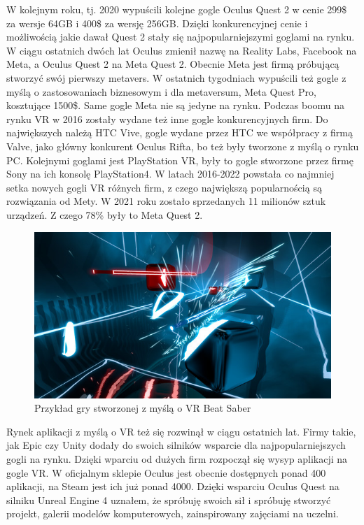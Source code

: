 \documentclass[a4paper,12pt,reqno]{article}
\begin{document}
W kolejnym roku, tj. 2020 wypuścili kolejne gogle Oculus Quest 2 w cenie 299\$ za
wersje 64GB i 400\$ za wersję 256GB. Dzięki konkurencyjnej cenie i możliwością
jakie dawał Quest 2 stały się najpopularniejszymi goglami na rynku. W ciągu
ostatnich dwóch lat Oculus zmienił nazwę na Reality Labs, Facebook na Meta, a
Oculus Quest 2 na Meta Quest 2. Obecnie Meta jest firmą próbującą stworzyć swój 
pierwszy metavers. W ostatnich tygodniach wypuścili też gogle z myślą o 
zastosowaniach biznesowym i dla metaversum, Meta Quest Pro, kosztujące 1500\$. Same 
gogle Meta nie są jedyne na rynku. Podczas boomu na rynku VR w 2016 zostały wydane 
też inne gogle konkurencyjnych firm. Do największych należą HTC Vive, gogle wydane 
przez HTC we współpracy z firmą Valve, jako główny konkurent Oculus Rifta, bo też 
były tworzone z myślą o rynku PC. Kolejnymi goglami jest PlayStation VR, były to 
gogle stworzone przez firmę Sony na ich konsolę PlayStation4. W latach 2016-2022 
powstała co najmniej setka nowych gogli VR różnych firm, z czego największą 
popularnością są rozwiązania od Mety\cite{popularnosc_gogli}. W 2021 roku zostało 
sprzedanych 11 milionów sztuk urządzeń. Z czego 78\% były to Meta Quest 
2\cite{ilosc_urzadzen}.

\begin{figure}[H]%
\centering
\includegraphics[width=0.8\columnwidth]{graphics/BeatSaber.jpg}
\caption{Przykład gry stworzonej z myślą o VR Beat Saber
\label{OpenBrush}}%
%
\qquad
\end{figure}  


Rynek aplikacji z myślą o VR też się rozwinął w ciągu ostatnich lat. Firmy takie, 
jak Epic czy Unity dodały do swoich silników wsparcie dla najpopularniejszych gogli 
na rynku. Dzięki wparciu od dużych firm rozpoczął się wysyp aplikacji na gogle VR. W 
oficjalnym sklepie Oculus jest obecnie dostępnych ponad 400 
aplikacji\cite{liczba_gier_quest}, na Steam jest ich
już ponad 4000\cite{liczba_gier_steam}. Dzięki wsparciu Oculus Quest na silniku 
Unreal Engine 4 uznałem, że spróbuję swoich sił i spróbuję stworzyć projekt, galerii 
modelów komputerowych, zainspirowany zajęciami na uczelni.
\end{document}
